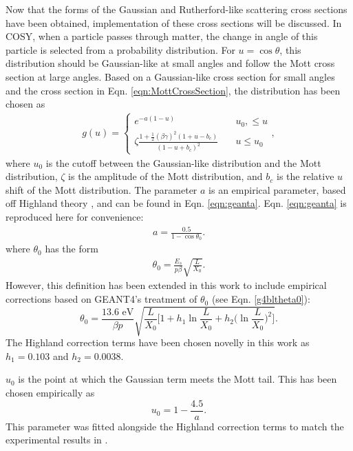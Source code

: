 \label{ssc:COSYScatteringImplementation} Now that the forms of the Gaussian and Rutherford-like scattering cross sections have been obtained, implementation of these cross sections will be discussed. In COSY, when a particle passes through matter, the change in angle of this particle is selected from a probability distribution. For $u=\cos\theta$, this distribution should be Gaussian-like at small angles \cite{gs} and follow the Mott cross section at large angles. Based on a Gaussian-like cross section for small angles and the cross section in Eqn. \ref{eqn:MottCrossSection}, the distribution has been chosen as
\begin{align}\label{eqn:cosyg}
g(u)=	\begin{cases}
	e^{-a(1-u)} & \quad u_0 ,\leq u \\
	\zeta\frac{1+\frac{1}{2}(\beta\gamma)^2(1+u-b_c)}{(1-u+b_c)^2} & \quad u\leq u_0
	\end{cases},
\end{align}
where $u_0$ is the cutoff between the Gaussian-like distribution and the Mott distribution, $\zeta$ is the amplitude of the Mott distribution, and $b_c$ is the relative $u$ shift of the Mott distribution. The parameter $a$ is an empirical parameter, based off Highland theory \cite{highland}, and can be found in Eqn. \ref{eqn:geanta}. Eqn. \ref{eqn:geanta} is reproduced here for convenience:
\begin{align*}
a=\frac{0.5}{1-\cos\theta_0}.
\end{align*}
where $\theta_0$ has the form \cite{highland} 
\begin{align*}
\theta_0 = \frac{E_s}{p\beta} \sqrt{\frac{L}{X_0}}.
\end{align*}
However, this definition has been extended in this work to include empirical corrections based on GEANT4's \cite{geant4} treatment of $\theta_0$ (see Eqn. \ref{g4bltheta0}):
\begin{equation}\label{eqn:cosytheta0}
\theta_0 = \frac{13.6 \text{ eV}}{\beta p} \sqrt{\frac{L}{X_0} \Big[ 1+h_1 \ln \frac{L}{X_0} + h_2 \Big(\ln \frac{L}{X_0}\Big)^2 \Big] }.
\end{equation}
The Highland correction terms have been chosen novelly in this work as $h_1=0.103$ and $h_2=0.0038$. 

$u_0$ is the point at which the Gaussian term meets the Mott tail. This has been chosen empirically as
\begin{equation}\label{eqn:cosyu0}
u_0=1-\frac{4.5}{a}.
\end{equation}
This parameter was fitted alongside the Highland correction terms to match the experimental results in \cite{muscat}.

